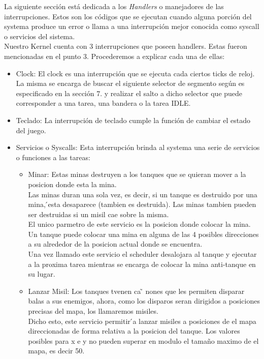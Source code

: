 La siguiente secci\'on est\'a dedicada a los \emph{Handlers} o manejadores de las interrupciones. Estos son los c\'odigos que se ejecutan
cuando alguna porci\'on del systema produce un error o llama a una interrupci\'on mejor conocida como syscall o servicios del sistema.\\
Nuestro Kernel cuenta con 3 interrupciones que poseen handlers. Estas fueron mencionadas en el punto 3. Procederemos a explicar cada una de
ellas:
\begin{itemize}
 \item Clock: El clock es una interrupci\'on que se ejecuta cada ciertos ticks de reloj. La misma se encarga de buscar el siguiente selector
de segmento según es especificado en la secci\'on 7. y realizar el salto a dicho selector que puede corresponder a una tarea, una bandera o 
la tarea IDLE.
 \item Teclado: La interrupci\'on de teclado cumple la funci\'on de cambiar el estado del juego.
 \item Servicios o Syscalls: Esta interrupci\'on brinda al systema una serie de servicios o funciones a las tareas:
  \begin{itemize}
   \item Minar: Estas minas destruyen a los tanques que se quieran mover a la posicion donde esta la mina.\\
   Las minas duran una sola vez, es decir, si un tanque es destruido por una mina, ́esta desaparece
(tambien es destruida). Las minas tambien pueden ser destruidas si un misil cae sobre la misma.\\
El unico parmetro de este servicio es la posicion donde colocar la mina. Un tanque puede colocar una mina 
en alguna de las 4 posibles direcciones a su alrededor de la posicion actual donde se encuentra.\\
Una vez llamado este servicio el scheduler desalojara al tanque y ejecutar a la proxima 
tarea mientras se encarga de colocar la mina anti-tanque en su lugar. \\
   \item Lanzar Misil: Los tanques tvenen ca ̃
nones que les permiten disparar balas a sus enemigos, ahora,
como los disparos seran dirigidos a posiciones precisas del mapa, los llamaremos misiles. \\
Dicho esto, este servicio permitir ́a lanzar misiles a posiciones de el mapa direccionadas
de forma relativa a la posicion del tanque. Los valores posibles para x e y no pueden
superar en modulo el tamaño maximo de el mapa, es decir 50.\\

\end{itemize}
\end{itemize}
